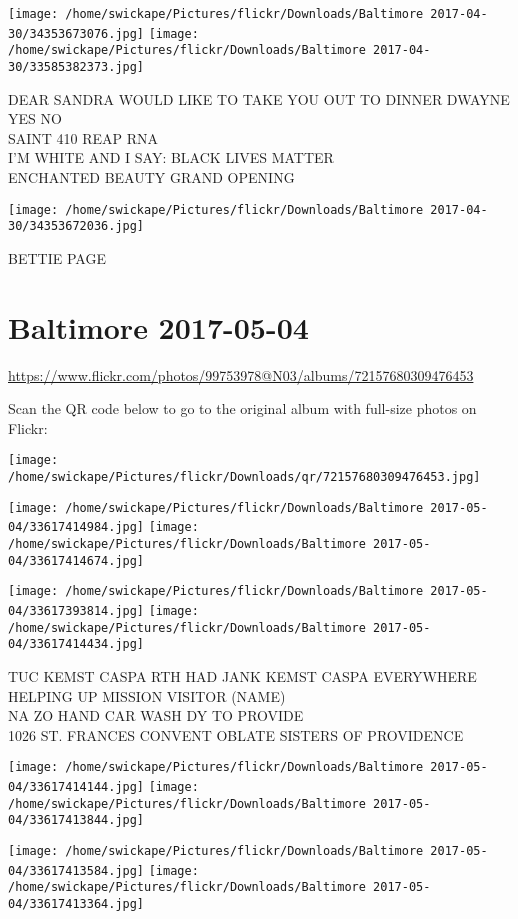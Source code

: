\documentclass[10pt,letterpaper]{article}
\begin{document}
\texttt{[image: /home/swickape/Pictures/flickr/Downloads/Baltimore 2017-04-30/34353673076.jpg]}
\texttt{[image: /home/swickape/Pictures/flickr/Downloads/Baltimore 2017-04-30/33585382373.jpg]}

DEAR SANDRA WOULD LIKE TO TAKE YOU OUT TO DINNER DWAYNE YES NO\\
SAINT 410 REAP RNA\\
I'M WHITE AND I SAY: BLACK LIVES MATTER\\
ENCHANTED BEAUTY GRAND OPENING
\pagebreak

\texttt{[image: /home/swickape/Pictures/flickr/Downloads/Baltimore 2017-04-30/34353672036.jpg]}

BETTIE PAGE
\pagebreak

\section*{Baltimore 2017-05-04}

\url{https://www.flickr.com/photos/99753978@N03/albums/72157680309476453}

Scan the QR code below to go to the original album with full-size photos on Flickr:

\texttt{[image: /home/swickape/Pictures/flickr/Downloads/qr/72157680309476453.jpg]}
\pagebreak

\texttt{[image: /home/swickape/Pictures/flickr/Downloads/Baltimore 2017-05-04/33617414984.jpg]}
\texttt{[image: /home/swickape/Pictures/flickr/Downloads/Baltimore 2017-05-04/33617414674.jpg]}

\texttt{[image: /home/swickape/Pictures/flickr/Downloads/Baltimore 2017-05-04/33617393814.jpg]}
\texttt{[image: /home/swickape/Pictures/flickr/Downloads/Baltimore 2017-05-04/33617414434.jpg]}

TUC KEMST CASPA RTH HAD JANK KEMST CASPA EVERYWHERE\\
HELPING UP MISSION VISITOR (NAME)\\
NA ZO HAND CAR WASH DY TO PROVIDE\\
1026 ST. FRANCES CONVENT OBLATE SISTERS OF PROVIDENCE
\pagebreak

\texttt{[image: /home/swickape/Pictures/flickr/Downloads/Baltimore 2017-05-04/33617414144.jpg]}
\texttt{[image: /home/swickape/Pictures/flickr/Downloads/Baltimore 2017-05-04/33617413844.jpg]}

\texttt{[image: /home/swickape/Pictures/flickr/Downloads/Baltimore 2017-05-04/33617413584.jpg]}
\texttt{[image: /home/swickape/Pictures/flickr/Downloads/Baltimore 2017-05-04/33617413364.jpg]}
\end{document}
